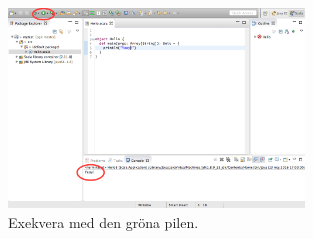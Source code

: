 \begin{itemize}
\begin{figure}[H]
\centering
\includegraphics[width=0.7\textwidth]{../img/pirates/exekvera.png} 
\caption {Exekvera med den gröna pilen.}
\label{fig:eclipse:ide:exec}
\end{figure}
\end{itemize}



